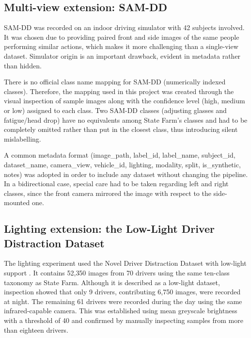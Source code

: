 
\subsection{Multi-view extension: SAM-DD}

SAM-DD \citep{yang2024samdd} was recorded on an indoor driving simulator with 42 subjects involved. It was chosen due to providing paired front and side images of the same people performing similar actions, which makes it more challenging than a single-view dataset. Simulator origin is an important drawback, evident in metadata rather than hidden.

There is no official class name mapping for SAM-DD (numerically indexed classes). Therefore, the mapping used in this project was created through the visual inspection of sample images along with the confidence level (high, medium or low) assigned to each class. Two SAM-DD classes (adjusting glasses and fatigue/head drop) have no equivalents among State Farm's classes and had to be completely omitted rather than put in the closest class, thus introducing silent mislabelling.

A common metadata format (image\_path, label\_id, label\_name, subject\_id, dataset\_name, camera\_view, vehicle\_id, lighting, modality, split, is\_synthetic, notes) was adopted in order to include any dataset without changing the pipeline. In a bidirectional case, special care had to be taken regarding left and right classes, since the front camera mirrored the image with respect to the side-mounted one.
    
\subsection{Lighting extension: the Low-Light Driver Distraction Dataset}
\label{sec:method-lowlight-data}

The lighting experiment used the Novel Driver Distraction Dataset with low-light support \citep{saad2020lowlight,saad2020dataset}. It contains 52,350 images from 70 drivers using the same ten-class taxonomy as State Farm. Although it is described as a low-light dataset, inspection showed that only 9 drivers, contributing 6,750 images, were recorded at night. The remaining 61 drivers were recorded during the day using the same infrared-capable camera. This was established using mean greyscale brightness with a threshold of 40 and confirmed by manually inspecting samples from more than eighteen drivers.

